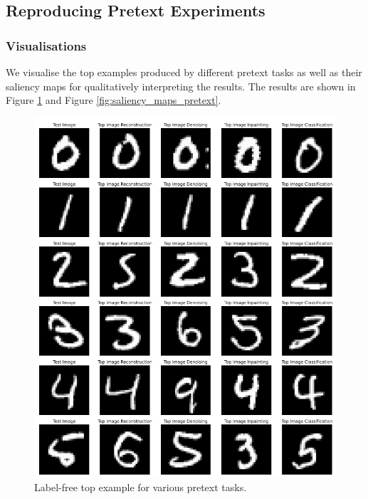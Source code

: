 \newpage
\subsection{Reproducing Pretext Experiments}
\label{appendix:pretext_visualisations}

\subsubsection{Visualisations}

We visualise the top examples produced by different pretext tasks as well as their saliency maps for qualitatively interpreting the results. The results are shown in Figure \ref{fig:topex_pretext} and Figure \ref{fig:saliency_maps_pretext}.

\begin{figure}[H]
    \centering
    \includegraphics[width=14cm]{images/top_pretext.png}
    \caption{Label-free top example for various pretext tasks.}
    \label{fig:topex_pretext}
\end{figure}

